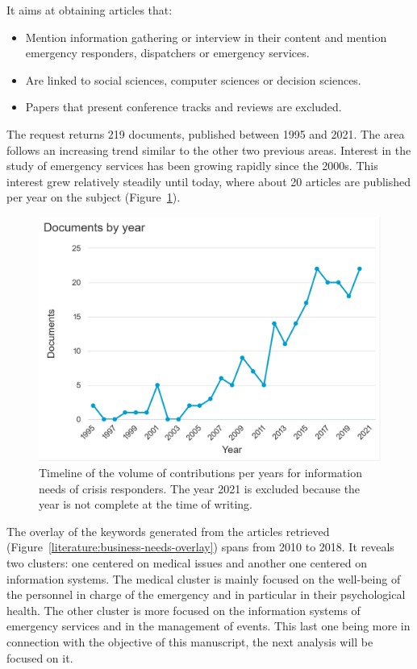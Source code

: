 It aims at obtaining articles that:

\begin{itemize}
    \item Mention information gathering or interview in their content and mention emergency responders, dispatchers or emergency services.
    \item Are linked to social sciences, computer sciences or decision sciences.
    \item Papers that present conference tracks and reviews are excluded.
\end{itemize}

The request returns 219 documents, published between 1995 and 2021.
The area follows an increasing trend similar to the other two previous areas.
Interest in the study of emergency services has been growing rapidly since the 2000s.
This interest grew relatively steadily until today, where about 20 articles are published per year on the subject (Figure~\ref{literature:business-needs-hist}).

\begin{figure}[htb]
    \centering
    \includegraphics[width=\textwidth]{figures/chap-2/business-needs-hist.pdf}
    \caption{Timeline of the volume of contributions per years for information needs of crisis responders. The year 2021 is excluded because the year is not complete at the time of writing.}
    \label{literature:business-needs-hist}
\end{figure}

The overlay of the keywords generated from the articles retrieved (Figure~\ref{literature:business-needs-overlay}) spans from 2010 to 2018.
It reveals two clusters: one centered on medical issues and another one centered on information systems.
The medical cluster is mainly focused on the well-being of the personnel in charge of the emergency and in particular in their psychological health.
The other cluster is more focused on the information systems of emergency services and in the management of events.
This last one being more in connection with the objective of this manuscript, the next analysis will be focused on it.

